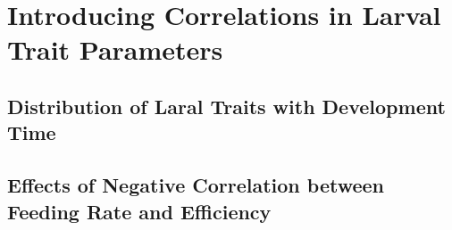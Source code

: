 \chapter{Introducing Correlations in Larval Trait Parameters}

\section{Distribution of Laral Traits with Development Time}

\section{Effects of Negative Correlation between Feeding Rate and Efficiency}
\pagebreak
